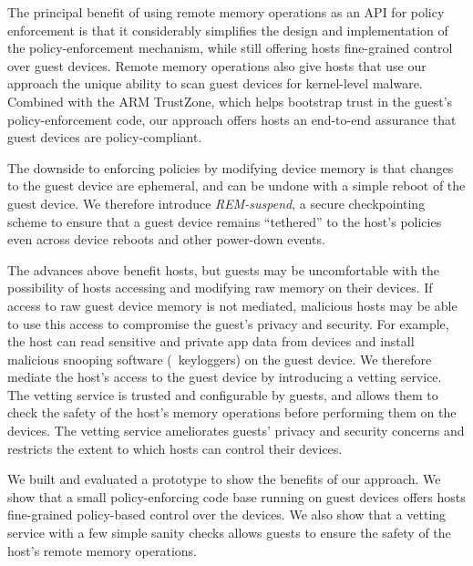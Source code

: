 \begin{mylist}
The principal benefit of using remote memory operations as an API for policy
enforcement is that it considerably simplifies the design and implementation of
the policy-enforcement mechanism, while still offering hosts fine-grained
control over guest devices.  Remote memory operations also give hosts that use
our approach the unique ability to scan guest devices for kernel-level malware.
Combined with the ARM TrustZone, which helps bootstrap trust in the guest's
policy-enforcement code, our approach offers hosts an end-to-end assurance that
guest devices are policy-compliant.
%
\item {} The downside to enforcing
policies by modifying device memory is that changes to the guest device are
ephemeral, and can be undone with a simple reboot of the guest device. We
therefore introduce \textit{REM-suspend}, a secure checkpointing scheme to
ensure that a guest device remains ``tethered'' to the host's policies even
across device reboots and other power-down events.
%
\item {} The advances
above benefit hosts, but guests may be uncomfortable with the possibility of
hosts accessing and modifying raw memory on their devices. If access to raw
guest device memory is not mediated, malicious hosts may be able to use this
access to compromise the guest's privacy and security. For example, the host
can read sensitive and private app data from devices and install malicious
snooping software (\eg~keyloggers) on the guest device.  We therefore mediate
the host's access to the guest device by introducing a vetting service. The
vetting service is trusted and configurable by guests, and allows them to check
the safety of the host's memory operations before performing them on the
devices.  The vetting service ameliorates guests' privacy and security concerns
and restricts the extent to which hosts can control their devices.
%
\end{mylist}

We built and evaluated a prototype to show the benefits of our approach. We
show that a small policy-enforcing code base running on guest devices offers
hosts fine-grained policy-based control over the devices. We also show that a
vetting service with a few simple sanity checks allows guests to ensure the
safety of the host's remote memory operations.
